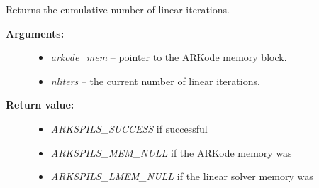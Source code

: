 \documentclass[letterpaper,10pt,english]{sphinxmanual}
\begin{document}
\begin{fulllineitems}
\label{c_interface/User_callable:c.ARKSpilsGetNumLinIters}
Returns the cumulative number of linear iterations.
\begin{description}
\item[{\textbf{Arguments:}}] \leavevmode\begin{itemize}
\item {} 
\emph{arkode\_mem} -- pointer to the ARKode memory block.

\item {} 
\emph{nliters} -- the current number of linear iterations.

\end{itemize}

\item[{\textbf{Return value:}}] \leavevmode\begin{itemize}
\item {} 
\emph{ARKSPILS\_SUCCESS} if successful

\item {} 
\emph{ARKSPILS\_MEM\_NULL} if the ARKode memory was 

\item {} 
\emph{ARKSPILS\_LMEM\_NULL} if the linear solver memory was 

\end{itemize}

\end{description}

\end{fulllineitems}

\end{document}

